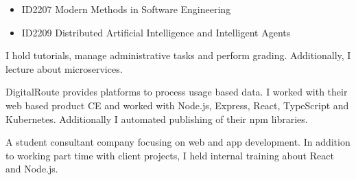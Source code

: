 \documentclass[10pt,a4paper]{altacv}
\begin{document}

\begin{fullwidth}
\makecvheader
\end{fullwidth}





\begin{itemize}
    \item ID2207 Modern Methods in Software Engineering
    \item ID2209 Distributed Artificial Intelligence and Intelligent Agents
\end{itemize}

I hold tutorials, manage administrative tasks and perform grading. Additionally, I lecture about microservices. 

\divider

DigitalRoute provides platforms to process usage based data. I worked with their web based product CE and worked with Node.js, Express, React, TypeScript and Kubernetes. Additionally I automated publishing of their npm libraries.

\divider


A student consultant company focusing on web and app development. In addition to working part time with client projects, I held internal training about React and Node.js.
\end{document}
